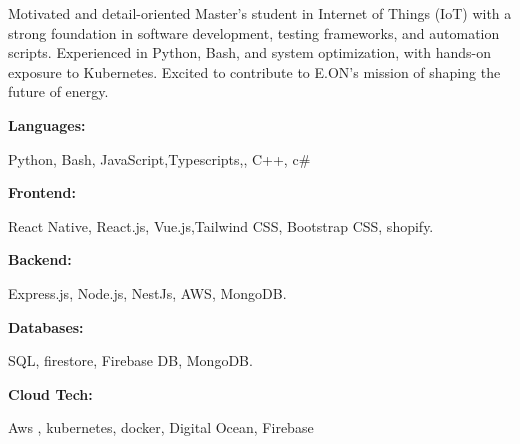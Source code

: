 \documentclass[9pt]{developercv}
\begin{document}
\begin{minipage}[t]{0.5\textwidth}
   \vspace{-1pt}
   Motivated and detail-oriented Master’s student in Internet of Things (IoT) with a strong foundation in software development, testing frameworks, and automation scripts. Experienced in Python, Bash, and system optimization, with hands-on exposure to Kubernetes. Excited to contribute to E.ON’s mission of shaping the future of energy.
\end{minipage}
\hfill %
\begin{minipage}[t]{0.465\textwidth}
   \vspace{0.5pt}

   \begin{minipage}[t]{1\textwidth}
      \textbf{Languages:}
   \end{minipage}
   \hfill
   \begin{minipage}[t]{1\textwidth}
      Python, Bash, JavaScript,Typescripts,, C++, c\# \end{minipage}


   \begin{minipage}[t]{1\textwidth}
      \textbf{Frontend:}
   \end{minipage}
   \hfill
   \begin{minipage}[t]{1\textwidth}
      React Native, React.js, Vue.js,Tailwind CSS, Bootstrap CSS, shopify. \end{minipage}
   \begin{minipage}[t]{1\textwidth}
      \textbf{Backend:}
   \end{minipage}
   \hfill
   \begin{minipage}[t]{1\textwidth}
      Express.js, Node.js, NestJs, AWS, MongoDB.
   \end{minipage}

   \begin{minipage}[t]{1\textwidth}
      \textbf{Databases:}
   \end{minipage}
   \hfill
   \begin{minipage}[t]{1\textwidth}
      SQL, firestore, Firebase DB, MongoDB.
   \end{minipage}
   \begin{minipage}[t]{1\textwidth}
      \textbf{Cloud Tech:}
   \end{minipage}
   \hfill
   \begin{minipage}[t]{1\textwidth}
      Aws , kubernetes, docker, Digital Ocean, Firebase
   \end{minipage}
\end{minipage}
\end{document}
